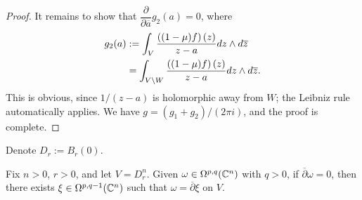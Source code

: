\documentclass{article}
\newcommand{\dol}{\overline{\partial}}
\begin{document}
\begin{proof}
    It remains to show that $\dfrac{\partial}{\partial\overline{a}}g_2(a)=0$, where
    \begin{align*}
        g_2(a) 
        &:= \int_{V}\frac{\left((1-\mu)f\right)(z)}{z-a}dz\wedge d\overline{z} \\
        &= \int_{V\setminus W}\frac{\left((1-\mu)f\right)(z)}{z-a}dz\wedge d\overline{z}.
    \end{align*}
    This is obvious, since $1/(z-a)$ is holomorphic away from $W$; the Leibniz rule automatically applies. We have $g=(g_1+g_2)/(2\pi i)$, and the proof is complete.
\end{proof}

Denote $D_r:=B_r(0)$.

\begin{proposition}
    Fix $n>0$, $r>0$, and let $V=D_r^n$. Given $\omega\in\Omega^{p,q}(\mathbb{C}^n)$ with $q>0$, if $\dol\omega=0$, then there exists $\xi\in\Omega^{p,q-1}(\mathbb{C}^n)$ such that $\omega=\dol\xi$ on $V$.
\end{proposition}
\end{document}
